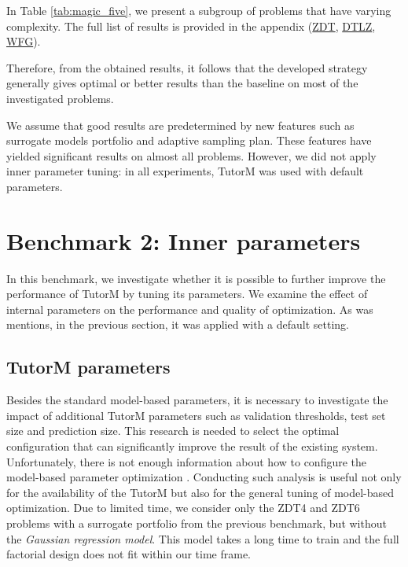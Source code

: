     In Table \ref{tab:magic_five}, we present a subgroup of problems that have varying complexity. The full list of results is provided in the appendix (\hyperref[tab:zdt_summary]{ZDT}, \hyperref[tab:dtlz_summary]{DTLZ}, \hyperref[tab:wfg_summary]{WFG}).

    

    Therefore, from the obtained results, it follows that the developed strategy generally gives optimal or better results than the baseline on most of the investigated problems. 

    We assume that good results are predetermined by new features such as surrogate models portfolio and adaptive sampling plan. These features have yielded significant results on almost all problems. However, we did not apply inner parameter tuning: in all experiments, TutorM was used with default parameters.

\section{Benchmark 2: Inner parameters} \label{sec:bench2}
    In this benchmark, we investigate whether it is possible to further improve the performance of TutorM by tuning its parameters. We examine the effect of internal parameters on the performance and quality of optimization. As was mentions, in the previous section, it was applied with a default setting. 

    \subsection{TutorM parameters}
    Besides the standard model-based parameters, it is necessary to investigate the impact of additional TutorM parameters such as validation thresholds, test set size and prediction size. This research is needed to select the optimal configuration that can significantly improve the result of the existing system. Unfortunately, there is not enough information about how to configure the model-based parameter optimization \cite{TobiasCV, HybridSurrRCG}. Conducting such analysis is useful not only for the availability of the TutorM but also for the general tuning of model-based optimization.  
    Due to limited time, we consider only the ZDT4 and ZDT6 problems with a surrogate portfolio from the previous benchmark, but without the \emph{Gaussian regression model}. This model takes a long time to train and the full factorial design does not fit within our time frame.

